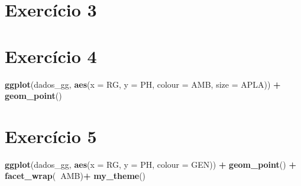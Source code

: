 \documentclass[
]{book}
\newenvironment{Shaded}{\begin{snugshade}}{\end{snugshade}}
\newcommand{\DataTypeTok}[1]{\textcolor[rgb]{0.13,0.29,0.53}{#1}}
\newcommand{\KeywordTok}[1]{\textcolor[rgb]{0.13,0.29,0.53}{\textbf{#1}}}
\newcommand{\NormalTok}[1]{#1}
\newcommand{\OperatorTok}[1]{\textcolor[rgb]{0.81,0.36,0.00}{\textbf{#1}}}
\newcommand{\StringTok}[1]{\textcolor[rgb]{0.31,0.60,0.02}{#1}}
\begin{document}
\hypertarget{exerc3}{%
\section{Exercício 3}\label{exerc3}}

\begin{Shaded}
\end{Shaded}

\hypertarget{exerc4}{%
\section{Exercício 4}\label{exerc4}}

\begin{Shaded}
\begin{Highlighting}[]
\KeywordTok{ggplot}\NormalTok{(dados_gg, }\KeywordTok{aes}\NormalTok{(}\DataTypeTok{x =}\NormalTok{ RG, }\DataTypeTok{y =}\NormalTok{ PH, }\DataTypeTok{colour =}\NormalTok{ AMB, }\DataTypeTok{size =}\NormalTok{ APLA)) }\OperatorTok{+}
\KeywordTok{geom_point}\NormalTok{()}
  
\end{Highlighting}
\end{Shaded}

\hypertarget{exerc5}{%
\section{Exercício 5}\label{exerc5}}

\begin{Shaded}
\begin{Highlighting}[]
\KeywordTok{ggplot}\NormalTok{(dados_gg, }\KeywordTok{aes}\NormalTok{(}\DataTypeTok{x =}\NormalTok{ RG, }\DataTypeTok{y =}\NormalTok{ PH, }\DataTypeTok{colour =}\NormalTok{ GEN)) }\OperatorTok{+}
\StringTok{     }\KeywordTok{geom_point}\NormalTok{() }\OperatorTok{+}
\StringTok{     }\KeywordTok{facet_wrap}\NormalTok{(}\OperatorTok{~}\NormalTok{AMB)}\OperatorTok{+}
\StringTok{     }\KeywordTok{my_theme}\NormalTok{()}
  
\end{Highlighting}
\end{Shaded}
\end{document}
